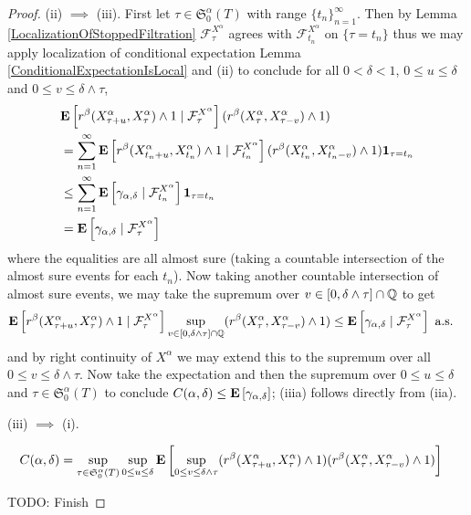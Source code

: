 \begin{proof}
(ii) $\implies$ (iii).  First let $\tau \in \mathfrak{S}^\alpha_0(T)$ with range $\lbrace t_n \rbrace_{n=1}^\infty$.  Then by Lemma \ref{LocalizationOfStoppedFiltration} $\mathcal{F}^{X^\alpha}_\tau$ agrees with $\mathcal{F}^{X^\alpha}_{t_n}$ on $\lbrace \tau = t_n \rbrace$ thus we may apply localization of conditional expectation Lemma \ref{ConditionalExpectationIsLocal}  and (ii) to conclude for all $0 < \delta < 1$, $0 \leq u \leq \delta$ and $0 \leq v \leq \delta \wedge \tau$,
\begin{align*}
&\cexpectationlong{\mathcal{F}^{X^\alpha}_\tau}{r^\beta(X^\alpha_{\tau +u}, X^\alpha_\tau) \wedge 1} (r^\beta(X^\alpha_{\tau}, X^\alpha_{\tau-v}) \wedge 1) \\
&=\sum_{n=1}^\infty \cexpectationlong{\mathcal{F}^{X^\alpha}_{t_n}}{r^\beta(X^\alpha_{t_n +u}, X^\alpha_{t_n}) \wedge 1} (r^\beta(X^\alpha_{t_n}, X^\alpha_{t_n-v}) \wedge 1) \characteristic{\tau = t_n} \\
&\leq \sum_{n=1}^\infty \cexpectationlong{\mathcal{F}^{X^\alpha}_{t_n}}{\gamma_{\alpha, \delta}}\characteristic{\tau = t_n} \\
&= \cexpectationlong{\mathcal{F}^{X^\alpha}_\tau}{\gamma_{\alpha, \delta}}\\
\end{align*}
where the equalities are all almost sure (taking a countable intersection of the almost sure events for each $t_n$).  Now taking another countable intersection of almost sure events, we may take the supremum over $v \in [0, \delta \wedge \tau] \cap \rationals$ to get 
\begin{align*}
\cexpectationlong{\mathcal{F}^{X^\alpha}_\tau}{r^\beta(X^\alpha_{\tau +u}, X^\alpha_\tau) \wedge 1} \sup_{v \in [0, \delta \wedge \tau] \cap \rationals} (r^\beta(X^\alpha_{\tau}, X^\alpha_{\tau-v}) \wedge 1)
&\leq \cexpectationlong{\mathcal{F}^{X^\alpha}_\tau}{\gamma_{\alpha, \delta}} \text{ a.s.}
\end{align*}
and by right continuity of $X^\alpha$ we may extend this to the supremum over all $0 \leq v \leq \delta \wedge \tau$.
Now take the expectation and then the supremum over $0 \leq u \leq \delta$ and $\tau \in \mathfrak{S}^\alpha_0(T)$ to conclude $C(\alpha, \delta) \leq \expectation{\gamma_{\alpha, \delta}}$;  (iiia) follows directly from (iia).

(iii) $\implies$ (i).  
\begin{clm}
\begin{align*}
C(\alpha, \delta) &= \sup_{\tau \in \mathfrak{S}^\alpha_0(T)} \sup_{0 \leq u \leq \delta} 
\expectation{\sup_{0 \leq v \leq \delta \wedge \tau} 
(r^\beta(X^\alpha_{\tau+u}, X^\alpha_\tau) \wedge 1)
(r^\beta(X^\alpha_{\tau}, X^\alpha_{\tau -v}) \wedge 1)}
\end{align*}
\end{clm}
TODO: Finish
\end{proof}

